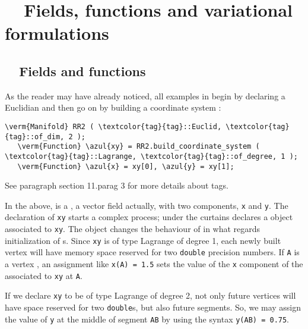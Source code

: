 
\chapter{~~Fields, functions and variational formulations}\label{\numb section 5}


\section{~~Fields and functions}\label{\numb section 5.\numb parag 1}

As the reader may have already noticed, all examples in {\maniFEM} begin by declaring a
Euclidian {\small\tt {}} and then go on by building a coordinate system :

\begin{Verbatim}[commandchars=\\\{\},formatcom=\small\tt,
   baselinestretch=0.94,framesep=2mm                     ]
   \verm{Manifold} RR2 ( \textcolor{tag}{tag}::Euclid, \textcolor{tag}{tag}::of_dim, 2 );
   \verm{Function} \azul{xy} = RR2.build_coordinate_system ( \textcolor{tag}{tag}::Lagrange, \textcolor{tag}{tag}::of_degree, 1 );
   \verm{Function} \azul{x} = xy[0], \azul{y} = xy[1];
\end{Verbatim}

See paragraph \numb section 11.\numb parag 3 for more details about tags.

In the above, {\small\tt {}} is a {\small\tt {}}, a vector field actually,
with two components, {\small\tt x} and {\small\tt y}.
The declaration of {\small\tt xy} starts a complex process; under the curtains
{\maniFEM} declares a {\small\tt {}} object associated to {\small\tt xy}.
The {\small\tt {}} object changes the behaviour of {\maniFEM} in what regards
initialization of {\small\tt {}}s.
Since {\small\tt xy} is of type Lagrange of degree 1, each newly built vertex
{\small\tt {}} will have memory space reserved for two {\small\tt double}
precision numbers.
If {\small\tt A} is a vertex {\small\tt {}}, an assignment like {\small\tt x(A) = 1.5}
sets the value of the {\small\tt x} component of the {\small\tt {}} associated to
{\small\tt xy} at {\small\tt A}.

If we declare {\small\tt xy} to be of type Lagrange of degree 2, not only future vertices will
have space reserved for two {\small\tt double}s, but also future segments.
So, we may assign the value of {\small\tt y} at the middle of segment {\small\tt AB} by using
the syntax {\small\tt y(AB) = 0.75}.

